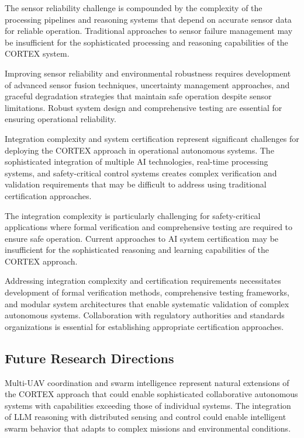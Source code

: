The sensor reliability challenge is compounded by the complexity of the processing pipelines and reasoning systems that depend on accurate sensor data for reliable operation. Traditional approaches to sensor failure management may be insufficient for the sophisticated processing and reasoning capabilities of the CORTEX system.

Improving sensor reliability and environmental robustness requires development of advanced sensor fusion techniques, uncertainty management approaches, and graceful degradation strategies that maintain safe operation despite sensor limitations. Robust system design and comprehensive testing are essential for ensuring operational reliability.

Integration complexity and system certification represent significant challenges for deploying the CORTEX approach in operational autonomous systems. The sophisticated integration of multiple AI technologies, real-time processing systems, and safety-critical control systems creates complex verification and validation requirements that may be difficult to address using traditional certification approaches.

The integration complexity is particularly challenging for safety-critical applications where formal verification and comprehensive testing are required to ensure safe operation. Current approaches to AI system certification may be insufficient for the sophisticated reasoning and learning capabilities of the CORTEX approach.

Addressing integration complexity and certification requirements necessitates development of formal verification methods, comprehensive testing frameworks, and modular system architectures that enable systematic validation of complex autonomous systems. Collaboration with regulatory authorities and standards organizations is essential for establishing appropriate certification approaches.

\subsection{Future Research Directions}

Multi-UAV coordination and swarm intelligence represent natural extensions of the CORTEX approach that could enable sophisticated collaborative autonomous systems with capabilities exceeding those of individual systems. The integration of LLM reasoning with distributed sensing and control could enable intelligent swarm behavior that adapts to complex missions and environmental conditions.

